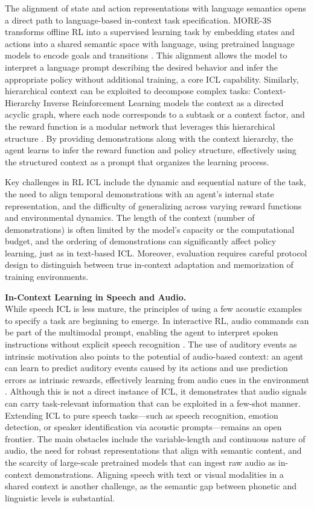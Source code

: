 \documentclass[11pt]{article}
\begin{document}
The alignment of state and action representations with language semantics opens a direct path to language-based in-context task specification. MORE-3S transforms offline RL into a supervised learning task by embedding states and actions into a shared semantic space with language, using pretrained language models to encode goals and transitions \cite{ref151}. This alignment allows the model to interpret a language prompt describing the desired behavior and infer the appropriate policy without additional training, a core ICL capability. Similarly, hierarchical context can be exploited to decompose complex tasks: Context-Hierarchy Inverse Reinforcement Learning models the context as a directed acyclic graph, where each node corresponds to a subtask or a context factor, and the reward function is a modular network that leverages this hierarchical structure \cite{ref152}. By providing demonstrations along with the context hierarchy, the agent learns to infer the reward function and policy structure, effectively using the structured context as a prompt that organizes the learning process.

Key challenges in RL ICL include the dynamic and sequential nature of the task, the need to align temporal demonstrations with an agent's internal state representation, and the difficulty of generalizing across varying reward functions and environmental dynamics. The length of the context (number of demonstrations) is often limited by the model's capacity or the computational budget, and the ordering of demonstrations can significantly affect policy learning, just as in text-based ICL. Moreover, evaluation requires careful protocol design to distinguish between true in-context adaptation and memorization of training environments.

\textbf{In-Context Learning in Speech and Audio.}\\
While speech ICL is less mature, the principles of using a few acoustic examples to specify a task are beginning to emerge. In interactive RL, audio commands can be part of the multimodal prompt, enabling the agent to interpret spoken instructions without explicit speech recognition \cite{ref150}. The use of auditory events as intrinsic motivation also points to the potential of audio-based context: an agent can learn to predict auditory events caused by its actions and use prediction errors as intrinsic rewards, effectively learning from audio cues in the environment \cite{ref153}. Although this is not a direct instance of ICL, it demonstrates that audio signals can carry task-relevant information that can be exploited in a few-shot manner. Extending ICL to pure speech tasks---such as speech recognition, emotion detection, or speaker identification via acoustic prompts---remains an open frontier. The main obstacles include the variable-length and continuous nature of audio, the need for robust representations that align with semantic content, and the scarcity of large-scale pretrained models that can ingest raw audio as in-context demonstrations. Aligning speech with text or visual modalities in a shared context is another challenge, as the semantic gap between phonetic and linguistic levels is substantial.
\end{document}
